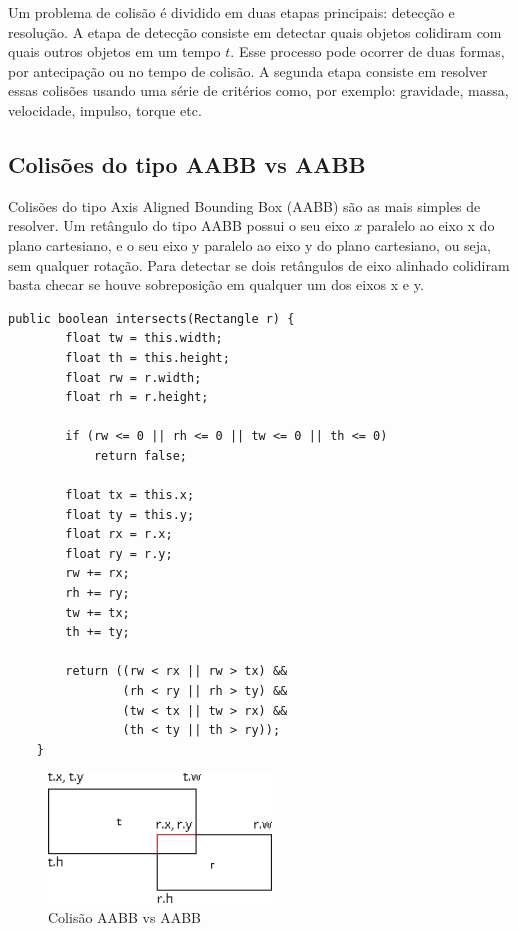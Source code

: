 \documentclass[12pt, 
openright, 
oneside, 
a4paper,    
brazil]{facom-ufu-abntex2}
\begin{document}
Um problema de colisão é dividido em duas etapas principais: detecção e resolução. A etapa de detecção consiste em detectar quais objetos colidiram com quais outros objetos em um tempo $t$. Esse processo pode ocorrer de duas formas, por antecipação ou no tempo de colisão. A segunda etapa consiste em resolver essas colisões usando uma série de critérios como, por exemplo: gravidade, massa, velocidade, impulso, torque etc.

\subsection{Colisões do tipo AABB vs AABB}

Colisões do tipo Axis Aligned Bounding Box (AABB) são as mais simples de resolver. Um retângulo do tipo AABB possui o seu eixo $x$ paralelo ao eixo x do plano cartesiano, e o seu eixo y paralelo ao eixo y do plano cartesiano, ou seja, sem qualquer rotação. Para detectar se dois retângulos de eixo alinhado colidiram basta checar se houve sobreposição em qualquer um dos eixos x e y.

\begin{lstlisting}[caption=Colisão AABB vs AABB]
	public boolean intersects(Rectangle r) {
    	float tw = this.width;
        float th = this.height;
        float rw = r.width;
        float rh = r.height;
        
        if (rw <= 0 || rh <= 0 || tw <= 0 || th <= 0) 
            return false;
        
        float tx = this.x;
        float ty = this.y;
        float rx = r.x;
        float ry = r.y;
        rw += rx;
        rh += ry;
        tw += tx;
        th += ty;
      
        return ((rw < rx || rw > tx) && 
                (rh < ry || rh > ty) &&
                (tw < tx || tw > rx) && 
                (th < ty || th > ry)); 
    }
\end{lstlisting}


\begin{figure}[H]
	\centering
	\includegraphics[width=16em]{imagens/aabbaabb.png}
	\caption{Colisão AABB vs AABB}
\end{figure}
\end{document}
